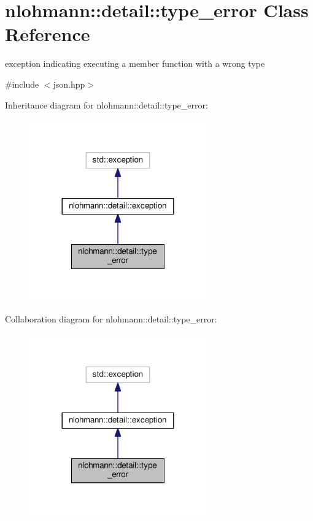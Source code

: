 \hypertarget{classnlohmann_1_1detail_1_1type__error}{}\section{nlohmann\+:\+:detail\+:\+:type\+\_\+error Class Reference}
\label{classnlohmann_1_1detail_1_1type__error}


exception indicating executing a member function with a wrong type  




{\ttfamily \#include $<$json.\+hpp$>$}



Inheritance diagram for nlohmann\+:\+:detail\+:\+:type\+\_\+error\+:
\nopagebreak
\begin{figure}[H]
\begin{center}
\leavevmode
\includegraphics[width=216pt]{classnlohmann_1_1detail_1_1type__error__inherit__graph}
\end{center}
\end{figure}


Collaboration diagram for nlohmann\+:\+:detail\+:\+:type\+\_\+error\+:
\nopagebreak
\begin{figure}[H]
\begin{center}
\leavevmode
\includegraphics[width=216pt]{classnlohmann_1_1detail_1_1type__error__coll__graph}
\end{center}
\end{figure}

